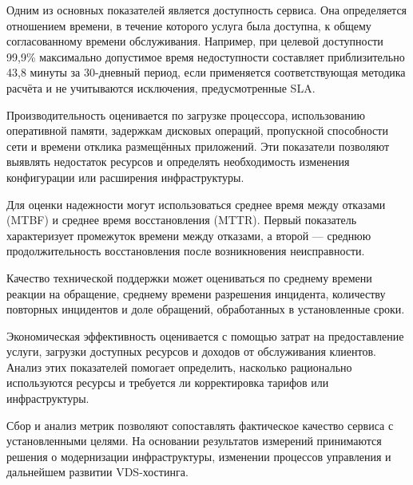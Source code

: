 \documentclass[14pt,a4paper]{extarticle}
\begin{document}
Одним из основных показателей является доступность сервиса. Она определяется отношением времени, в течение которого услуга была доступна, к общему согласованному времени обслуживания. Например, при целевой доступности 99,9\% максимально допустимое время недоступности составляет приблизительно 43,8 минуты за 30-дневный период, если применяется соответствующая методика расчёта и не учитываются исключения, предусмотренные SLA.

Производительность оценивается по загрузке процессора, использованию оперативной памяти, задержкам дисковых операций, пропускной способности сети и времени отклика размещённых приложений. Эти показатели позволяют выявлять недостаток ресурсов и определять необходимость изменения конфигурации или расширения инфраструктуры.

Для оценки надежности могут использоваться среднее время между отказами (MTBF) и среднее время восстановления (MTTR). Первый показатель характеризует промежуток времени между отказами, а второй — среднюю продолжительность восстановления после возникновения неисправности.

Качество технической поддержки может оцениваться по среднему времени реакции на обращение, среднему времени разрешения инцидента, количеству повторных инцидентов и доле обращений, обработанных в установленные сроки.

Экономическая эффективность оценивается с помощью затрат на предоставление услуги, загрузки доступных ресурсов и доходов от обслуживания клиентов. Анализ этих показателей помогает определить, насколько рационально используются ресурсы и требуется ли корректировка тарифов или инфраструктуры.

Сбор и анализ метрик позволяют сопоставлять фактическое качество сервиса с установленными целями. На основании результатов измерений принимаются решения о модернизации инфраструктуры, изменении процессов управления и дальнейшем развитии VDS-хостинга.
\end{document}
